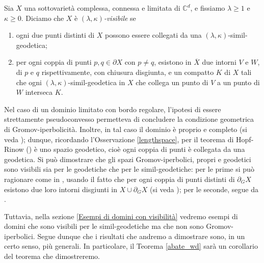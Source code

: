 \begin{defn} \label{visibility}
    Sia $X$ una sottovarietà complessa, connessa e limitata di $\mathbb{C}^d$, e fissiamo $\lambda \ge 1$ e $\kappa \ge 0$. Diciamo che $X$ è \textit{$(\lambda,\kappa)$-visibile} se
    \begin{enumerate}
        \item ogni due punti distinti di $X$ possono essere collegati da una $(\lambda,\kappa)$-simil-geodetica;
        \item per ogni coppia di punti $p,q\in\partial X$ con $p\not=q$, esistono in $\overline{X}$ due intorni $V$ e $W$, di $p$ e $q$ rispettivamente, con chiusura disgiunta, e un compatto $K$ di $X$ tali che  ogni $(\lambda,\kappa)$-simil-geodetica in $X$ che collega un punto di $V$ a un punto di $W$ interseca $K$.
    \end{enumerate}
\end{defn}

\begin{oss} \label{spscvxisvis}
    Nel caso di un dominio limitato con bordo regolare, l'ipotesi di essere strettamente pseudoconvesso permetteva di concludere la condizione geometrica di Gromov-iperbolicità. Inoltre, in tal caso il dominio è proprio e completo (si veda \cite[Paragraph 3.3]{G}); dunque, ricordando l'Osservazione \ref{lengthspace}, per il teorema di Hopf-Rinow (\cite[Part I, Proposition 3.7]{BH}) è uno spazio geodetico, cioè ogni coppia di punti è collegata da una geodetica. Si può dimostrare che gli spazi Gromov-iperbolici, propri e geodetici sono visibili sia per le geodetiche che per le simil-geodetiche: per le prime si può ragionare come in \cite[Proposition 2.5]{BNT}, usando il fatto che per ogni coppia di punti distinti di $\partial_G X$ esistono due loro intorni disgiunti in $X\cup\partial_GX$ (si veda \cite[Part III, Chapter H, Lemma 3.6]{BH}); per le seconde, segue da \cite[Part III, Chapter H, Theorem 1.7]{BH}.
\end{oss}

Tuttavia, nella sezione \ref{Esempi di domini con visibilità} vedremo esempi di domini che sono visibili per le simil-geodetiche ma che non sono Gromov-iperbolici. Segue dunque che i risultati che andremo a dimostrare sono, in un certo senso, più generali. In particolare, il Teorema \ref{abate_wd} sarà un corollario del teorema che dimostreremo. \\

